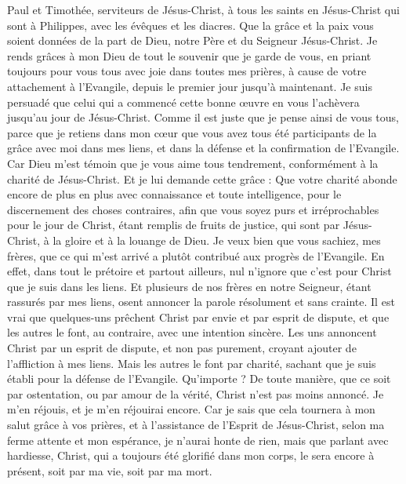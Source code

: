 \begin{multicols}{2}
\VerseOne{}Paul et Timothée, serviteurs de Jésus-Christ, à tous les saints en Jésus-Christ qui sont à Philippes, avec les évêques et les diacres.
Que la grâce et la paix vous soient données de la part de Dieu, notre Père et du Seigneur Jésus-Christ.
Je rends grâces à mon Dieu de tout le souvenir que je garde de vous,
en priant toujours pour vous tous avec joie dans toutes mes prières,
à cause de votre attachement à l'Evangile, depuis le premier jour jusqu'à maintenant.
Je suis persuadé que celui qui a commencé cette bonne œuvre en vous l'achèvera jusqu'au jour de Jésus-Christ.
Comme il est juste que je pense ainsi de vous tous, parce que je retiens dans mon cœur que vous avez tous été participants de la grâce avec moi dans mes liens, et dans la défense et la confirmation de l'Evangile.
Car Dieu m'est témoin que je vous aime tous tendrement, conformément à la charité de Jésus-Christ.
Et je lui demande cette grâce : Que votre charité abonde encore de plus en plus avec connaissance et toute intelligence,
pour le discernement des choses contraires, afin que vous soyez purs et irréprochables pour le jour de Christ,
étant remplis de fruits de justice, qui sont par Jésus-Christ, à la gloire et à la louange de Dieu.
Je veux bien que vous sachiez, mes frères, que ce qui m’est arrivé a plutôt contribué aux progrès de l'Evangile.
En effet, dans tout le prétoire et partout ailleurs, nul n’ignore que c’est pour Christ que je suis dans les liens.
Et plusieurs de nos frères en notre Seigneur, étant rassurés par mes liens, osent annoncer la parole résolument et sans crainte.
Il est vrai que quelques-uns prêchent Christ par envie et par esprit de dispute, et que les autres le font, au contraire, avec une intention sincère.
Les uns annoncent Christ par un esprit de dispute, et non pas purement, croyant ajouter de l'affliction à mes liens.
Mais les autres le font par charité, sachant que je suis établi pour la défense de l'Evangile.
Qu’importe ? De toute manière, que ce soit par ostentation, ou par amour de la vérité, Christ n’est pas moins annoncé. Je m’en réjouis, et je m’en réjouirai encore.
Car je sais que cela tournera à mon salut grâce à vos prières, et à l’assistance de l'Esprit de Jésus-Christ,
selon ma ferme attente et mon espérance, je n’aurai honte de rien, mais que parlant avec hardiesse, Christ, qui a toujours été glorifié dans mon corps, le sera encore à présent, soit par ma vie, soit par ma mort.

\end{multicols}
